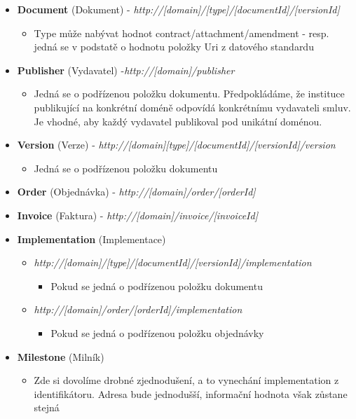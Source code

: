 \begin{itemize}
\item \textbf{Document} (Dokument) - \textit{http://[domain]/[type]/[documentId]/[versionId]}
	\begin{itemize}
	\item Type může nabývat hodnot contract/attachment/amendment - resp. jedná se v podstatě o hodnotu položky Uri z datového standardu 
	\end{itemize}
\item \textbf{Publisher} (Vydavatel) -\textit{http://[domain]/publisher}
	\begin{itemize}
	\item Jedná se o podřízenou položku dokumentu. Předpokládáme, že instituce publikující na konkrétní doméně odpovídá konkrétnímu vydavateli smluv. Je vhodné, aby každý vydavatel publikoval pod unikátní doménou. 
	\end{itemize}
\item \textbf{Version} (Verze) - \textit{http://[domain][type]/[documentId]/[versionId]/version}
	\begin{itemize}
	\item Jedná se o podřízenou položku dokumentu 
	\end{itemize}
\item \textbf{Order} (Objednávka) - \textit{http://[domain]/order/[orderId]}
\item \textbf{Invoice} (Faktura) - \textit{http://[domain]/invoice/[invoiceId]}
\item \textbf{Implementation} (Implementace)
	\begin{itemize}
	\item \textit{http://[domain]/[type]/[documentId]/[versionId]/implementation}
		\begin{itemize}
		\item Pokud se jedná o podřízenou položku dokumentu
		\end{itemize}
	\item \textit{http://[domain]/order/[orderId]/implementation}
		\begin{itemize}
		\item Pokud se jedná o  podřízenou položku objednávky
		\end{itemize}
	\end{itemize}
\item \textbf{Milestone} (Milník) 
\begin{itemize}
	\item Zde si dovolíme drobné zjednodušení, a to vynechání implementation z identifikátoru. Adresa bude jednodušší, informační hodnota však zůstane stejná

\end{itemize}
\end{itemize}
